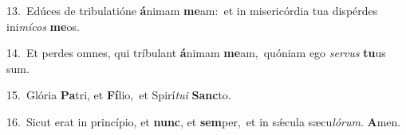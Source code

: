 {\numbfont\textcolor{\numbcolor}{13.}}~Edúces de tribulatióne \textbf{á}\-nimam \textbf{me}\-am:~\star et in misericórdia tua dispérdes ini\-\textit{mí}\-\textit{cos} \textbf{me}\-os.\par
{\numbfont\textcolor{\numbcolor}{14.}}~Et perdes omnes, qui tríbulant \textbf{á}\-nimam \textbf{me}\-am,~\star quóniam ego \textit{ser}\-\textit{vus} \textbf{tu}\-us sum.\par
{\numbfont\textcolor{\numbcolor}{15.}}~Glória \textbf{Pa}\-tri, et \textbf{Fí}\-lio,~\star et Spirí\-\textit{tu}\-\textit{i} \textbf{Sanc}\-to.\par
{\numbfont\textcolor{\numbcolor}{16.}}~Sicut erat in princípio, et \textbf{nunc}\-, et \textbf{sem}\-per,~\star et in sǽcula sæcu\-\textit{ló}\-\textit{rum}. \textbf{A}\-men.\par
